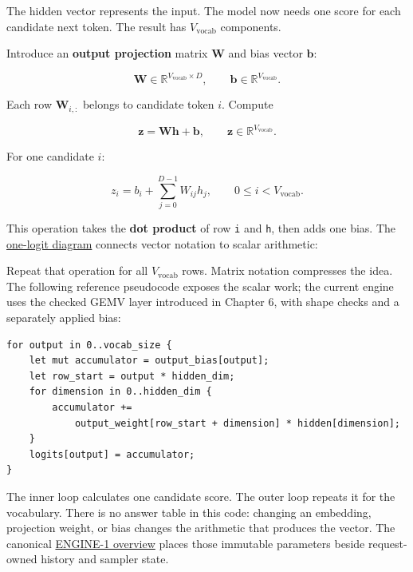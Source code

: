 The hidden vector represents the input. The model now needs one score
for each candidate next token. The result has \(V_{\mathrm{vocab}}\)
components.

Introduce an \textbf{output projection} matrix \(\mathbf{W}\) and bias
vector \(\mathbf{b}\):

\begin{equation}
\mathbf{W}\in\mathbb{R}^{V_{\mathrm{vocab}}\times D},
\qquad \mathbf{b}\in\mathbb{R}^{V_{\mathrm{vocab}}}.
\end{equation}

Each row \(\mathbf{W}_{i,:}\) belongs to candidate token \(i\). Compute

\begin{equation}
\mathbf{z}=\mathbf{W}\mathbf{h}+\mathbf{b},
\qquad \mathbf{z}\in\mathbb{R}^{V_{\mathrm{vocab}}}.
\end{equation}

For one candidate \(i\):

\begin{equation}
z_i=b_i+\sum_{j=0}^{D-1}W_{ij}h_j,
\qquad 0\le i<V_{\mathrm{vocab}}.
\end{equation}

This operation takes the \textbf{dot product} of row \texttt{i} and
\texttt{h}, then adds one bias. The
\href{https://github.com/hermonai/inside-the-llm-engine/blob/astra-visual-rewrite/diagrams/model/one-logit-dot-product.txt}{one-logit
diagram} connects vector notation to scalar arithmetic:


Repeat that operation for all \(V_{\mathrm{vocab}}\) rows. Matrix
notation compresses the idea. The following reference pseudocode exposes
the scalar work; the current engine uses the checked GEMV layer introduced
in Chapter 6, with shape checks and a separately applied bias:

\begin{verbatim}
for output in 0..vocab_size {
    let mut accumulator = output_bias[output];
    let row_start = output * hidden_dim;
    for dimension in 0..hidden_dim {
        accumulator +=
            output_weight[row_start + dimension] * hidden[dimension];
    }
    logits[output] = accumulator;
}
\end{verbatim}

The inner loop calculates one candidate score. The outer loop repeats it
for the vocabulary. There is no answer table in this code: changing an
embedding, projection weight, or bias changes the arithmetic that
produces the vector. The canonical
\href{https://github.com/hermonai/inside-the-llm-engine/blob/astra-visual-rewrite/diagrams/model/engine-1-overview.txt}{ENGINE-1
overview} places those immutable parameters beside request-owned history
and sampler state.


